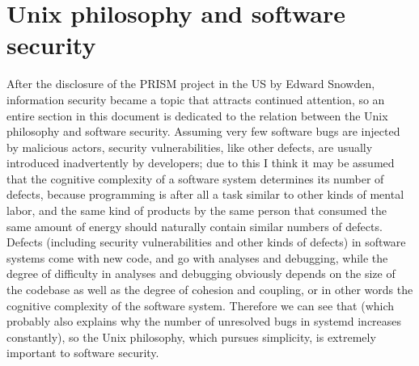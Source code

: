 \section{Unix philosophy and software security}\label{sec:security}

After the disclosure of the PRISM project in the US by Edward Snowden,
information security became a topic that attracts continued attention, so an
entire section in this document is dedicated to the relation between the Unix
philosophy and software security.  Assuming very few software bugs are injected
by malicious actors, security vulnerabilities, like other defects, are usually
introduced inadvertently by developers; due to this I think it may be assumed
that the cognitive complexity of a software system determines its number of
defects, because programming is after all a task similar to other kinds of
mental labor, and the same kind of products by the same person that consumed
the same amount of energy should naturally contain similar numbers of defects.
Defects (including security vulnerabilities and other kinds of defects) in
software systems come with new code, and go with analyses and debugging, while
the degree of difficulty in analyses and debugging obviously depends on the
size of the codebase as well as the degree of cohesion and coupling, or in
other words the cognitive complexity of the software system.  Therefore we can
see that 
(which probably also explains why the number of unresolved bugs
in systemd increases constantly), so the Unix philosophy, which
pursues simplicity, is extremely important to software security.

